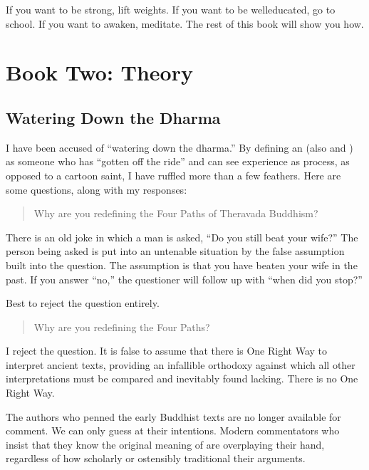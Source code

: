 \documentclass[a5paper,10pt,english]{book}
\begin{document}
\sphinxAtStartPar
If you want to be strong, lift weights. If you want to be well\sphinxhyphen{}educated,
go to school. If you want to awaken, meditate. The rest of this book
will show you how.

\sphinxstepscope


\chapter{Book Two: Theory}
\label{\detokenize{main-2:book-two-theory}}\label{\detokenize{main-2::doc}}

\section{Watering Down the Dharma}
\label{\detokenize{main-2:watering-down-the-dharma}}
\sphinxAtStartPar
I have been accused of “watering down the dharma.” By defining an
 (also  and ) as someone who has “gotten off the
ride” and can see experience as process, as opposed to a cartoon saint,
I have ruffled more than a few feathers. Here are some questions, along
with my responses:
\begin{quote}

\sphinxAtStartPar
Why are you redefining the Four Paths of Theravada Buddhism?
\end{quote}

\sphinxAtStartPar
There is an old joke in which a man is asked, “Do you still beat your
wife?” The person being asked is put into an untenable situation by the
false assumption built into the question. The assumption is that you
have beaten your wife in the past. If you answer “no,” the questioner
will follow up with “when did you stop?”

\sphinxAtStartPar
Best to reject the question entirely.
\begin{quote}

\sphinxAtStartPar
Why are you redefining the Four Paths?
\end{quote}

\sphinxAtStartPar
I reject the question. It is false to assume that there is One Right Way
to interpret ancient texts, providing an infallible orthodoxy against
which all other interpretations must be compared and inevitably found
lacking. There is no One Right Way.

\sphinxAtStartPar
The authors who penned the early Buddhist texts are no longer available
for comment. We can only guess at their intentions. Modern commentators
who insist that they know the original meaning of  are
overplaying their hand, regardless of how scholarly or ostensibly
traditional their arguments.
\end{document}
